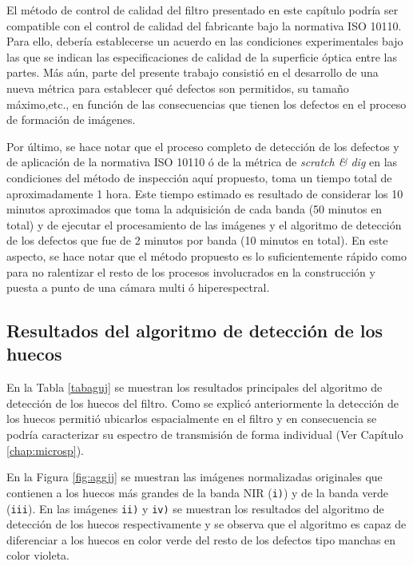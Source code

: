 El método de control de calidad del filtro presentado en este capítulo podría ser compatible con el control de calidad del fabricante bajo la normativa ISO 10110. Para ello, debería establecerse un acuerdo en las condiciones experimentales bajo las que se indican las especificaciones de calidad de la superficie óptica entre las partes. Más aún, parte del presente trabajo consistió en el desarrollo de una nueva métrica para establecer qué defectos son permitidos, su tamaño máximo,etc., en función de las consecuencias que tienen los defectos en el proceso de formación de imágenes.

Por último, se hace notar que el proceso completo de detección de los defectos y de aplicación de la normativa ISO 10110 ó de la métrica de \textit{scratch \& dig} en las condiciones del método de inspección aquí propuesto, toma un tiempo total de aproximadamente 1 hora. Este tiempo estimado es resultado de considerar los 10 minutos aproximados que toma la adquisición de cada banda (50 minutos en total) y de ejecutar el procesamiento de las imágenes y el algoritmo de detección de los defectos que fue de 2 minutos por banda (10 minutos en total). En este aspecto, se hace notar que el método propuesto es lo suficientemente rápido como para no ralentizar el resto de los procesos involucrados en la construcción y puesta a punto de una cámara multi ó  hiperespectral.

\singlespacing
\subsection{Resultados del algoritmo de detección de los huecos}
\label{sec:aguj}

\hspace{0.5cm} En la Tabla \ref{tabaguj} se muestran los resultados principales del algoritmo de detección de los huecos del filtro. Como se explicó anteriormente la detección de los huecos permitió ubicarlos espacialmente en el filtro y en consecuencia se podría caracterizar su espectro de transmisión de forma individual (Ver Capítulo \ref{chap:microsp}).

En la Figura \ref{fig:aggjj} se muestran las imágenes normalizadas originales que contienen a los huecos más grandes de la banda NIR (\texttt{i)}) y de la banda verde (\texttt{iii}). En las imágenes \texttt{ii)} y \texttt{iv)} se muestran los resultados del algoritmo de detección de los huecos respectivamente y se observa que el algoritmo es capaz de diferenciar a los huecos en color verde del resto de los defectos tipo manchas en color violeta.

